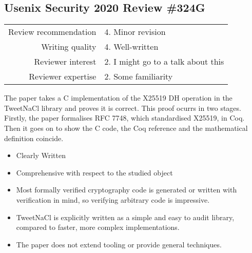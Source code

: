 \newpage
\subsection{Usenix Security 2020 Review \#324G}

\begin{tabular}{rl}
    \toprule
    Review recommendation & 4. Minor revision                  \\
    Writing quality       & 4. Well-written                    \\
    Reviewer interest     & 2. I might go to a talk about this \\
    Reviewer expertise    & 2. Some familiarity                \\
    \bottomrule
\end{tabular}

\begin{center}
\end{center}
The paper takes a C implementation of the X25519 DH operation in the TweetNaCl library and proves it is correct. This proof ocurrs in two stages. Firstly, the paper formalises RFC 7748, which standardised X25519, in Coq. Then it goes on to show the C code, the Coq reference and the mathematical definition coincide.

\begin{center}
\end{center}

\begin{itemize}
    \item Clearly Written
    \item Comprehensive with respect to the studied object
    \item Most formally verified cryptography code is generated or written with verification in mind, so verifying arbitrary code is impressive.
\end{itemize}

\begin{center}
\end{center}

\begin{itemize}
    \item TweetNaCl is explicitly written as a simple and easy to audit library, compared to faster, more complex implementations.
    \item The paper does not extend tooling or provide general techniques.
\end{itemize}

